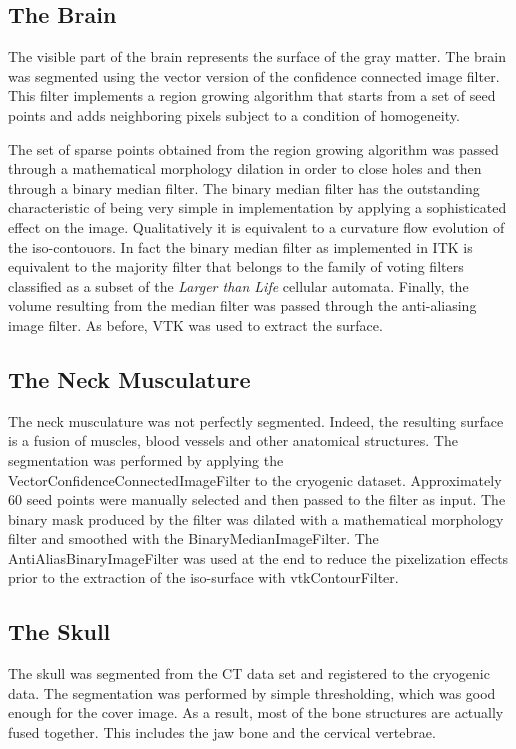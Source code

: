 \subsection*{The Brain}

The visible part of the brain represents the surface of the gray matter.  The
brain was segmented using the vector version of the confidence connected
image filter.  This filter implements a region growing algorithm that starts
from a set of seed points and adds neighboring pixels subject to a condition
of homogeneity.

The set of sparse points obtained from the region growing algorithm was
passed through a mathematical morphology dilation in order to close holes and
then through a binary median filter. The binary median filter has the
outstanding characteristic of being very simple in implementation by applying
a sophisticated effect on the image. Qualitatively it is equivalent to a
curvature flow evolution of the iso-contouors. In fact the binary median
filter as implemented in ITK is equivalent to the majority filter that
belongs to the family of voting filters classified as a subset of the
\emph{Larger than Life} cellular automata. Finally, the volume resulting from
the median filter was passed through the anti-aliasing image filter. As
before, VTK was used to extract the surface.

\subsection*{The Neck Musculature}

The neck musculature was not perfectly segmented. Indeed, the resulting
surface is a fusion of muscles, blood vessels and other anatomical
structures. The segmentation was performed by applying the
VectorConfidenceConnectedImageFilter to the cryogenic dataset.  Approximately
60 seed points were manually selected and then passed to the filter as
input. The binary mask produced by the filter was dilated with a mathematical
morphology filter and smoothed with the BinaryMedianImageFilter. The
AntiAliasBinaryImageFilter was used at the end to reduce the pixelization
effects prior to the extraction of the iso-surface with vtkContourFilter.

\subsection*{The Skull}

The skull was segmented from the CT data set and registered to the cryogenic
data. The segmentation was performed by simple thresholding, which was good
enough for the cover image. As a result, most of the bone structures are
actually fused together. This includes the jaw bone and the cervical
vertebrae.


